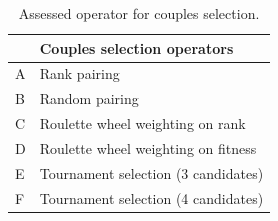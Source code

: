 \documentclass{ametsoc}
\begin{document}

%
%
%



%

\begin{table}[t]
	\caption{Assessed operator for couples selection.}
	\begin{center}
		\begin{tabular}{ll}
			\hline\hline  & \textbf{Couples selection operators} \\ 
			\hline 
			A & Rank pairing \\ 
			B & Random pairing \\ 
			C & Roulette wheel weighting on rank \\ 
			D & Roulette wheel weighting on fitness \\ 
			E & Tournament selection (3 candidates) \\ 
			F & Tournament selection (4 candidates) \\ 
			\hline 
		\end{tabular}
	\end{center}
	\label{tab:assessed_couples_selection_operators}
\end{table}
\end{document}
